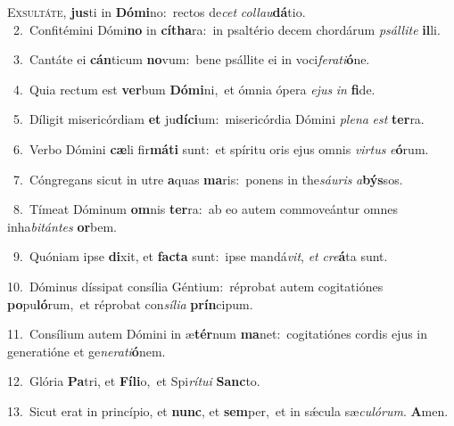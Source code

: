 \lettrine{\initial\textcolor{\initialcolor}{E}}{xsultáte,} \textbf{jus}\-ti in \textbf{Dó}\-\textbf{mi}no:~\star rectos de\textit{cet} \textit{col}\-\textit{lau}\textbf{dá}tio.\\
{\numbfont\textcolor{\numbcolor}{~2.}}~Confitémini Dómi\textbf{no} in \textbf{cí}\-\textbf{tha}ra:~\star in psaltério decem chordárum \textit{psál}\-\textit{li}\textit{te} \textbf{il}\-li.\par
{\numbfont\textcolor{\numbcolor}{~3.}}~Cantáte ei \textbf{cán}\-ticum \textbf{no}\-vum:~\star bene psállite ei in voci\-\textit{fe}\-\textit{ra}\textit{ti}\textbf{ó}ne.\par
{\numbfont\textcolor{\numbcolor}{~4.}}~Quia rectum est \textbf{ver}\-bum \textbf{Dó}\-\textbf{mi}ni,~\star et ómnia ópera \textit{e}\-\textit{jus} \textit{in} \textbf{fi}\-de.\par
{\numbfont\textcolor{\numbcolor}{~5.}}~Díligit misericórdiam \textbf{et} ju\-\textbf{dí}\-\textbf{ci}um:~\star misericórdia Dómini \textit{ple}\-\textit{na} \textit{est} \textbf{ter}\-ra.\par
{\numbfont\textcolor{\numbcolor}{~6.}}~Verbo Dómini \textbf{cæ}\-li fir\-\textbf{má}\-\textbf{ti} sunt:~\star et spíritu oris ejus omnis \textit{vir}\-\textit{tus} \textit{e}\-\textbf{ó}rum.\par
{\numbfont\textcolor{\numbcolor}{~7.}}~Cóngregans sicut in utre \textbf{a}\-quas \textbf{ma}\-ris:~\star ponens in the\-\textit{sáu}\-\textit{ris} \textit{a}\-\textbf{býs}sos.\par
{\numbfont\textcolor{\numbcolor}{~8.}}~Tímeat Dóminum \textbf{om}\-nis \textbf{ter}\-ra:~\star ab eo autem commoveántur omnes inha\-\textit{bi}\-\textit{tán}\textit{tes} \textbf{or}\-bem.\par
{\numbfont\textcolor{\numbcolor}{~9.}}~Quóniam ipse \textbf{di}\-xit, et \textbf{fac}\-\textbf{ta} sunt:~\star ipse mandá\-\textit{vit}\-, \textit{et} \textit{cre}\-\textbf{á}ta sunt.\par
{\numbfont\textcolor{\numbcolor}{10.}}~Dóminus díssipat consília Géntium:~\dagger réprobat autem cogitatiónes \textbf{po}\-pu\-\textbf{ló}\-rum,~\star et réprobat con\-\textit{sí}\-\textit{li}\textit{a} \textbf{prín}\-cipum.\par
{\numbfont\textcolor{\numbcolor}{11.}}~Consílium autem Dómini in æ\-\textbf{tér}\-num \textbf{ma}\-net:~\star cogitatiónes cordis ejus in generatióne et ge\-\textit{ne}\-\textit{ra}\textit{ti}\textbf{ó}nem.\par
{\numbfont\textcolor{\numbcolor}{12.}}~Glória \textbf{Pa}\-tri, et \textbf{Fí}\-\textbf{li}o,~\star et Spi\-\textit{rí}\-\textit{tu}\textit{i} \textbf{Sanc}\-to.\par
{\numbfont\textcolor{\numbcolor}{13.}}~Sicut erat in princípio, et \textbf{nunc}\-, et \textbf{sem}\-per,~\star et in sǽcula sæ\-\textit{cu}\-\textit{ló}\textit{rum}. \textbf{A}\-men.\par
